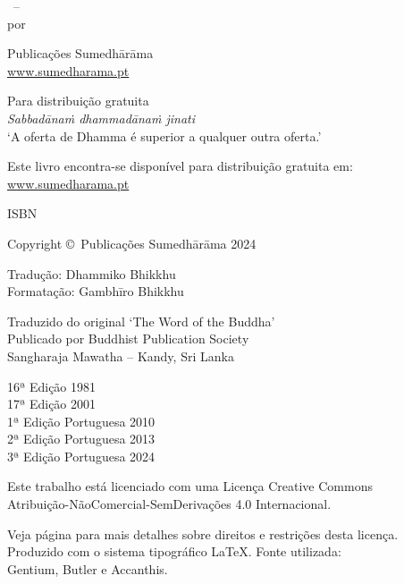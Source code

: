 \cleartoverso
\thispagestyle{empty}

{\copyrightsize
\centering
\setlength{\parindent}{0pt}%
\setlength{\parskip}{0.8\baselineskip}%

\thetitle\ -- \thesubtitle\\
por \theauthor

Publicações Sumedhārāma\\
\href{https://sumedharama.pt}{www.sumedharama.pt}

Para distribuição gratuita\\
\textit{Sabbadānaṁ dhammadānaṁ jinati}\\
‘A oferta de Dhamma é superior a qualquer outra oferta.’

Este livro encontra-se disponível para distribuição gratuita em:\\
\href{https://sumedharama.pt}{www.sumedharama.pt}

ISBN \theISBN

Copyright \copyright\ Publicações Sumedhārāma 2024

Tradução: Dhammiko Bhikkhu\\
Formatação: Gambhīro Bhikkhu

Traduzido do original `The Word of the Buddha'\\
Publicado por Buddhist Publication Society\\
Sangharaja Mawatha -- Kandy, Sri Lanka

16ª Edição 1981\\
17ª Edição 2001\\
1ª Edição Portuguesa 2010\\
2ª Edição Portuguesa 2013\\
3ª Edição Portuguesa 2024

\vfill

{\footnotesize

Este trabalho está licenciado com uma Licença Creative Commons\\
Atribuição-NãoComercial-SemDerivações 4.0 Internacional.

Veja página \pageref{copyright-details} para mais detalhes sobre direitos e restrições desta licença.\\
Produzido com o sistema tipográfico \LaTeX. Fonte utilizada:\\
Gentium, Butler e Accanthis.


\theEditionInfo

}}

